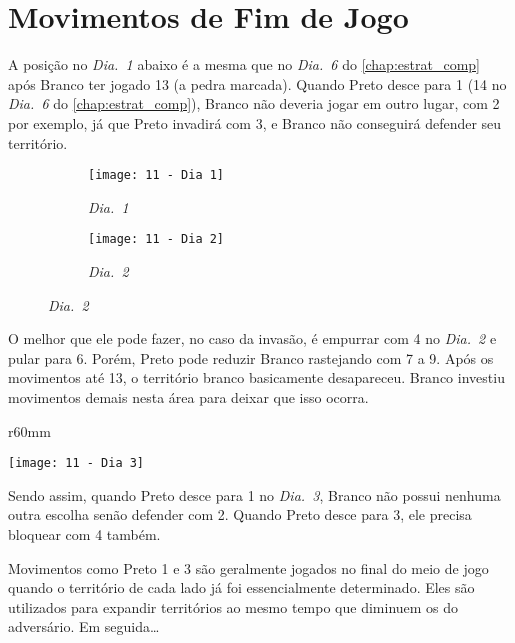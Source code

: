 \chapter{Movimentos de Fim de Jogo}

A posição no \emph{Dia.\@~1} abaixo é a mesma que no \emph{Dia.\@~6} do \autoref{chap:estrat_comp} após Branco ter jogado 13 (a pedra marcada). Quando Preto desce para 1 (14 no \emph{Dia.\@~6} do \autoref{chap:estrat_comp}), Branco não deveria jogar em outro lugar, com 2 por exemplo, já que Preto invadirá com 3, e Branco não conseguirá defender seu território.

\begin{figure}[h!]
    \centering
    \begin{subfigure}[t]{.475\textwidth}
        \texttt{[image: 11 - Dia 1]}
        \captionsetup{justification=centering}
        \caption*{\emph{Dia.\@~1}}
    \end{subfigure}
    \hfill
    \begin{subfigure}[t]{.475\textwidth}
        \texttt{[image: 11 - Dia 2]}
        \captionsetup{justification=centering}
        \caption*{\emph{Dia.\@~2}}
    \end{subfigure}
\end{figure}

O melhor que ele pode fazer, no caso da invasão, é empurrar com 4 no \emph{Dia.\@~2} e pular para 6. Porém, Preto pode reduzir Branco rastejando com 7 a 9. Após os movimentos até 13, o território branco basicamente desapareceu. Branco investiu movimentos demais nesta área para deixar que isso ocorra.

\pagebreak

\begin{wrapfigure}{r}{60mm}
    \vspace{-20pt}
    \begin{center}
        \texttt{[image: 11 - Dia 3]}
        \captionsetup{justification=centering}
        \caption*{\emph{Dia.\@~3}}
    \end{center}
    \vspace{-31pt}
\end{wrapfigure}

Sendo assim, quando Preto desce para 1 no \emph{Dia.\@~3}, Branco não possui nenhuma outra escolha senão defender com 2. Quando Preto desce para 3, ele precisa bloquear com 4 também.

Movimentos como Preto 1 e 3 são geralmente jogados no final do meio de jogo quando o território de cada lado já foi essencialmente determinado. Eles são utilizados para expandir territórios ao mesmo tempo que diminuem os do adversário. Em seguida\ldots


